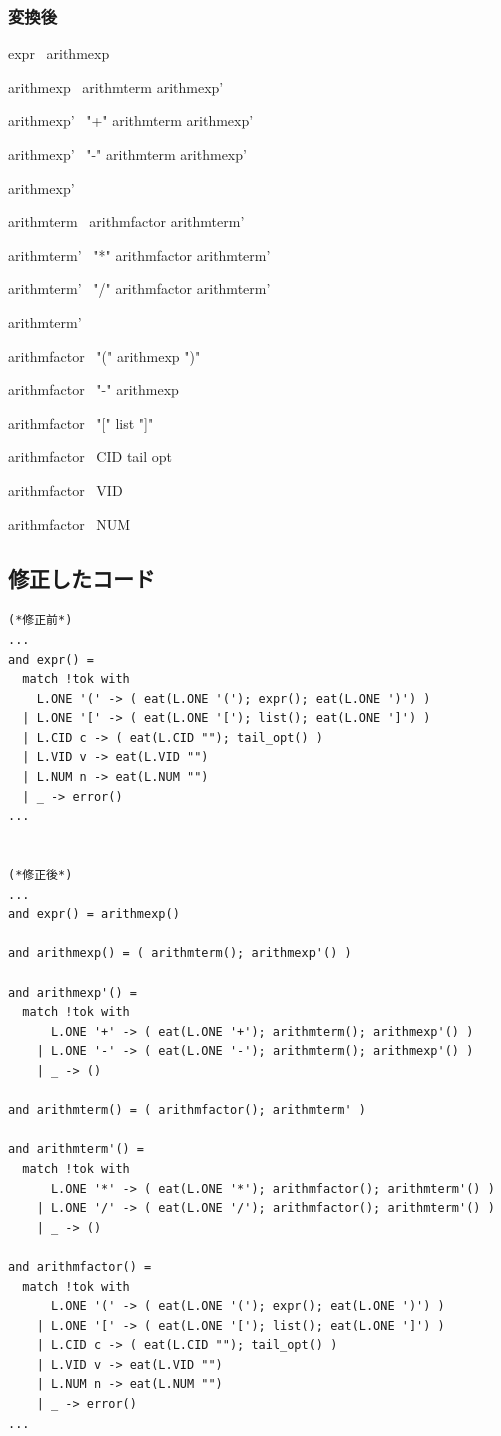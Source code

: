 \documentclass{ltjsarticle}
\begin{document}
\subsubsection{変換後}
expr \rightarrow \  arithmexp\par
arithmexp \rightarrow \  arithmterm arithmexp'\par
arithmexp' \rightarrow \  "+" arithmterm arithmexp'\par
arithmexp' \rightarrow \  "-" arithmterm arithmexp'\par
arithmexp' \rightarrow \  \par
arithmterm \rightarrow \  arithmfactor arithmterm'\par
arithmterm' \rightarrow \   "*" arithmfactor arithmterm'\par
arithmterm' \rightarrow \   "/" arithmfactor arithmterm'\par
arithmterm' \rightarrow \  \par
arithmfactor \rightarrow \  "(" arithmexp ")"\par
arithmfactor \rightarrow \  "-" arithmexp\par
arithmfactor \rightarrow \  "[" list "]"\par
arithmfactor \rightarrow \  CID tail opt\par
arithmfactor \rightarrow \  VID\par
arithmfactor \rightarrow \  NUM\par

\subsection{修正したコード}
\begin{lstlisting}[caption = 算術式 修正点]
(*修正前*)
...
and expr() =
  match !tok with
    L.ONE '(' -> ( eat(L.ONE '('); expr(); eat(L.ONE ')') )
  | L.ONE '[' -> ( eat(L.ONE '['); list(); eat(L.ONE ']') )
  | L.CID c -> ( eat(L.CID ""); tail_opt() )
  | L.VID v -> eat(L.VID "")
  | L.NUM n -> eat(L.NUM "")
  | _ -> error()
...


(*修正後*)
...
and expr() = arithmexp()

and arithmexp() = ( arithmterm(); arithmexp'() )

and arithmexp'() =
  match !tok with
      L.ONE '+' -> ( eat(L.ONE '+'); arithmterm(); arithmexp'() )
    | L.ONE '-' -> ( eat(L.ONE '-'); arithmterm(); arithmexp'() ) 
    | _ -> ()

and arithmterm() = ( arithmfactor(); arithmterm' )

and arithmterm'() = 
  match !tok with 
      L.ONE '*' -> ( eat(L.ONE '*'); arithmfactor(); arithmterm'() )
    | L.ONE '/' -> ( eat(L.ONE '/'); arithmfactor(); arithmterm'() )
    | _ -> ()

and arithmfactor() = 
  match !tok with 
      L.ONE '(' -> ( eat(L.ONE '('); expr(); eat(L.ONE ')') )
    | L.ONE '[' -> ( eat(L.ONE '['); list(); eat(L.ONE ']') )
    | L.CID c -> ( eat(L.CID ""); tail_opt() )
    | L.VID v -> eat(L.VID "")
    | L.NUM n -> eat(L.NUM "")
    | _ -> error()
...
\end{lstlisting}
\end{document}
